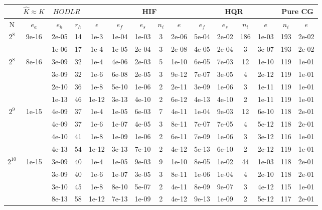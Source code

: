 \documentclass[11pt]{article}
\begin{document}
\begin{table}[!htbp]
\centering
\begin{tabular}{|c|c|c|c|c|c|c|c|c|c|c|c|c|c|c|}
\hline
\multicolumn{1}{c|}{} & \multicolumn{1}{c|}{$\hat{K} \approx K$} & \multicolumn{2}{c|}{$HODLR$} & \multicolumn{1}{c|}{} &\multicolumn{4}{c|}{HIF} & \multicolumn{4}{c|}{HQR} & \multicolumn{2}{c|}{Pure CG} \\
\hline
N & $e_{a}$ & $e_{h}$ & $r_{h}$ & $\epsilon$ & $e_{f}$ & $e_{s}$ & $n_{i}$ & $e$ & $e_{f}$  & $e_{s}$ & $n_{i}$ & $e$ &  $n_{i}$ & $e$ \\ 
\hline
$2^{8}$ & 9e-16 & 2e-05 & 14 & 1e-3 & 1e-04 & 1e-03 & 3 & 2e-06 & 5e-04 & 2e-02 & 186 & 1e-03 & 193 & 2e-02\\
~ & ~ & 1e-06 & 17 & 1e-4 & 1e-05 & 2e-04 & 3 & 2e-08 & 4e-05 & 2e-04 & 3 & 3e-07 & 193 & 2e-02\\
\hline
$2^{8}$ & 8e-16 & 3e-09 & 32 & 1e-4 & 4e-06 & 2e-03 & 5 & 1e-10 & 6e-05 & 7e-03 & 12 & 1e-10 & 119 & 1e-01\\
~ & ~ & 3e-09 & 32 & 1e-6 & 6e-08 & 2e-05 & 3 & 9e-12 & 7e-07 & 3e-05 & 4 & 2e-12 & 119 & 1e-01\\
~ & ~ & 2e-10 & 36 & 1e-8 & 5e-10 & 1e-06 & 2 & 2e-11 & 3e-09 & 1e-06 & 3 & 1e-11 & 119 & 1e-01\\
~ & ~ & 1e-13 & 46 & 1e-12 & 3e-13 & 4e-10 & 2 & 6e-12 & 4e-13 & 4e-10 & 2 & 1e-11 & 119 & 1e-01\\
\hline
$2^{9}$ & 1e-15 & 4e-09 & 37 & 1e-4 & 1e-05 & 6e-03 & 7 & 4e-11 & 1e-04 & 9e-03 & 12 & 6e-10 & 118 & 2e-01\\
~ & ~ & 4e-09 & 37 & 1e-6 & 1e-07 & 4e-05 & 3 & 8e-11 & 7e-07 & 7e-05 & 4 & 5e-12 & 118 & 2e-01\\
~ & ~ & 4e-10 & 41 & 1e-8 & 1e-09 & 1e-06 & 2 & 6e-11 & 7e-09 & 1e-06 & 3 & 3e-12 & 116 & 1e-01\\
~ & ~ & 4e-13 & 54 & 1e-12 & 3e-13 & 7e-10 & 2 & 4e-12 & 5e-13 & 6e-10 & 2 & 2e-12 & 119 & 1e-01\\
\hline
$2^{10}$ & 1e-15 & 3e-09 & 40 & 1e-4 & 1e-05 & 9e-03 & 9 & 1e-10 & 8e-05 & 1e-02 & 44 & 1e-03 & 118 & 2e-01\\
~ & ~ & 3e-09 & 40 & 1e-6 & 1e-07 & 3e-05 & 3 & 8e-11 & 1e-06 & 1e-04 & 4 & 2e-10 & 118 & 2e-01\\
~ & ~ & 3e-10 & 45 & 1e-8 & 8e-10 & 5e-07 & 2 & 4e-11 & 8e-09 & 9e-07 & 3 & 4e-12 & 115 & 1e-01\\
~ & ~ & 8e-13 & 58 & 1e-12 & 7e-13 & 1e-09 & 2 & 4e-12 & 9e-13 & 1e-09 & 2 & 5e-12 & 117 & 2e-01\\

\end{tabular}
\end{table}
\end{document}
